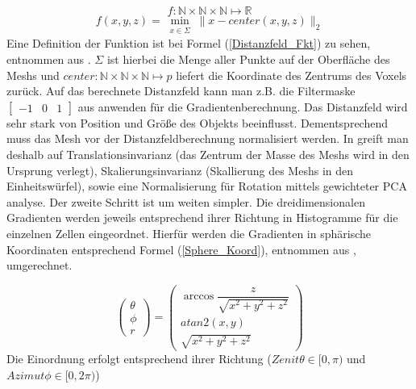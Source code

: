 \begin{equation*}
f: \mathbb{N} \times \mathbb{N} \times \mathbb{N} \mapsto \mathbb{R} 
\end{equation*}
\begin{equation}
\label{Distanzfeld_Fkt}
f(x,y,z) = \min_{\substack{x \in \Sigma}} \| x-center(x,y,z) \|_2
\end{equation}
Eine Definition der Funktion ist bei Formel (\ref{Distanzfeld_Fkt}) zu sehen, entnommen aus \cite{scherer2010histograms}. $\Sigma$ ist hierbei die Menge aller Punkte auf der Oberfläche des Meshs und $center: \mathbb{N} \times \mathbb{N} \times \mathbb{N} \mapsto p $ liefert die Koordinate des Zentrums des Voxels zurück.
\newline
Auf das berechnete Distanzfeld kann man z.B. die Filtermaske $\begin{bmatrix} -1 & 0 & 1\end{bmatrix}$ aus \cite{dalal2005histograms} anwenden für die Gradientenberechnung.
\newline
Das Distanzfeld wird sehr stark von Position und Größe des Objekts beeinflusst. Dementsprechend muss das Mesh vor der Distanzfeldberechnung normalisiert werden. In \cite{scherer2010histograms} greift man deshalb auf Translationsinvarianz  (das Zentrum der Masse des Meshs wird in den Ursprung verlegt), Skalierungsinvarianz (Skallierung des Meshs in den Einheitswürfel), sowie eine Normalisierung für Rotation mittels gewichteter PCA analyse.
\newline
Der zweite Schritt ist um weiten simpler. Die dreidimensionalen Gradienten werden jeweils entsprechend ihrer Richtung in Histogramme für die einzelnen Zellen eingeordnet. Hierfür werden die Gradienten in sphärische Koordinaten entsprechend Formel (\ref{Sphere_Koord}), entnommen aus \cite{scherer2010histograms}, umgerechnet.

\begin{equation}
\label{Sphere_Koord}
\begin{pmatrix}
	\theta \\ 
	 \phi \\ 
	 r
\end{pmatrix}
= \begin{pmatrix}
	\arccos\dfrac{z}{\sqrt{x^2+y^2+z^2}} \\ 
	 atan2(x,y) \\ 
	 \sqrt{x^2+y^2+z^2}
\end{pmatrix}
\end{equation}
Die Einordnung erfolgt entsprechend ihrer Richtung ($Zenit \theta \in [0,\pi) $ und $Azimut \phi \in [0,2\pi)$)  

